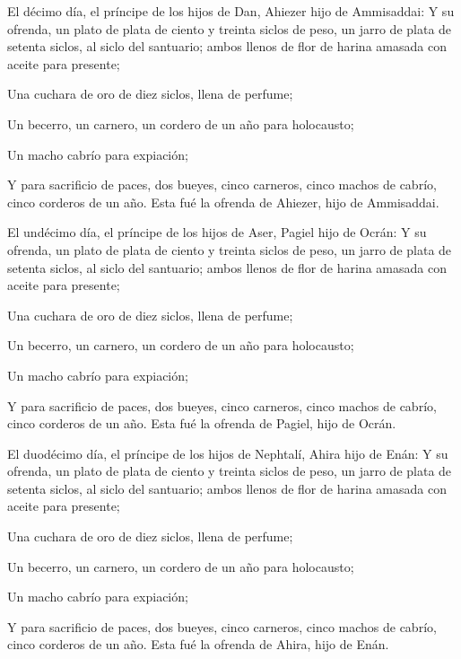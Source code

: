  El décimo día, el príncipe de los hijos de Dan, Ahiezer
hijo de Ammisaddai:  Y su ofrenda, un plato de plata de
ciento y treinta siclos de peso, un jarro de plata de setenta siclos, al
siclo del santuario; ambos llenos de flor de harina amasada con aceite
para presente;

 Una cuchara de oro de diez siclos, llena de perfume;

 Un becerro, un carnero, un cordero de un año para
holocausto;

 Un macho cabrío para expiación;

 Y para sacrificio de paces, dos bueyes, cinco carneros,
cinco machos de cabrío, cinco corderos de un año. Esta fué la ofrenda de
Ahiezer, hijo de Ammisaddai.

 El undécimo día, el príncipe de los hijos de Aser,
Pagiel hijo de Ocrán:  Y su ofrenda, un plato de plata de
ciento y treinta siclos de peso, un jarro de plata de setenta siclos, al
siclo del santuario; ambos llenos de flor de harina amasada con aceite
para presente;

 Una cuchara de oro de diez siclos, llena de perfume;

 Un becerro, un carnero, un cordero de un año para
holocausto;

 Un macho cabrío para expiación;

 Y para sacrificio de paces, dos bueyes, cinco carneros,
cinco machos de cabrío, cinco corderos de un año. Esta fué la ofrenda de
Pagiel, hijo de Ocrán.

 El duodécimo día, el príncipe de los hijos de Nephtalí,
Ahira hijo de Enán:  Y su ofrenda, un plato de plata de
ciento y treinta siclos de peso, un jarro de plata de setenta siclos, al
siclo del santuario; ambos llenos de flor de harina amasada con aceite
para presente;

 Una cuchara de oro de diez siclos, llena de perfume;

 Un becerro, un carnero, un cordero de un año para
holocausto;

 Un macho cabrío para expiación;

 Y para sacrificio de paces, dos bueyes, cinco carneros,
cinco machos de cabrío, cinco corderos de un año. Esta fué la ofrenda de
Ahira, hijo de Enán.

